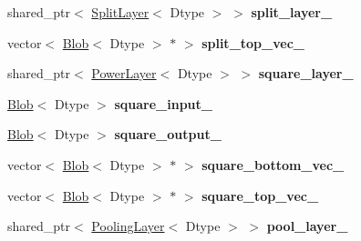 \begin{DoxyCompactItemize}
\item 
shared\+\_\+ptr$<$ \hyperlink{classcaffe_1_1SplitLayer}{Split\+Layer}$<$ Dtype $>$ $>$ {\bfseries split\+\_\+layer\+\_\+}\hypertarget{classcaffe_1_1LRNLayer_a7126b6cbb83ddafb80c9d9dc6d44f88f}{}\label{classcaffe_1_1LRNLayer_a7126b6cbb83ddafb80c9d9dc6d44f88f}

\item 
vector$<$ \hyperlink{classcaffe_1_1Blob}{Blob}$<$ Dtype $>$ $\ast$ $>$ {\bfseries split\+\_\+top\+\_\+vec\+\_\+}\hypertarget{classcaffe_1_1LRNLayer_a9b199156b8113800365c64c22e0e177a}{}\label{classcaffe_1_1LRNLayer_a9b199156b8113800365c64c22e0e177a}

\item 
shared\+\_\+ptr$<$ \hyperlink{classcaffe_1_1PowerLayer}{Power\+Layer}$<$ Dtype $>$ $>$ {\bfseries square\+\_\+layer\+\_\+}\hypertarget{classcaffe_1_1LRNLayer_a440a40fc6ec9131fd8425dabe8a48fa9}{}\label{classcaffe_1_1LRNLayer_a440a40fc6ec9131fd8425dabe8a48fa9}

\item 
\hyperlink{classcaffe_1_1Blob}{Blob}$<$ Dtype $>$ {\bfseries square\+\_\+input\+\_\+}\hypertarget{classcaffe_1_1LRNLayer_a750c4b6871af300f8de03b5eda197056}{}\label{classcaffe_1_1LRNLayer_a750c4b6871af300f8de03b5eda197056}

\item 
\hyperlink{classcaffe_1_1Blob}{Blob}$<$ Dtype $>$ {\bfseries square\+\_\+output\+\_\+}\hypertarget{classcaffe_1_1LRNLayer_a50c1f72f225f69d344857fc55dc52ef9}{}\label{classcaffe_1_1LRNLayer_a50c1f72f225f69d344857fc55dc52ef9}

\item 
vector$<$ \hyperlink{classcaffe_1_1Blob}{Blob}$<$ Dtype $>$ $\ast$ $>$ {\bfseries square\+\_\+bottom\+\_\+vec\+\_\+}\hypertarget{classcaffe_1_1LRNLayer_a0361883b2eada25a56b5a90f5ff99cac}{}\label{classcaffe_1_1LRNLayer_a0361883b2eada25a56b5a90f5ff99cac}

\item 
vector$<$ \hyperlink{classcaffe_1_1Blob}{Blob}$<$ Dtype $>$ $\ast$ $>$ {\bfseries square\+\_\+top\+\_\+vec\+\_\+}\hypertarget{classcaffe_1_1LRNLayer_accfb1597e6045b09dcdb421ba7e92070}{}\label{classcaffe_1_1LRNLayer_accfb1597e6045b09dcdb421ba7e92070}

\item 
shared\+\_\+ptr$<$ \hyperlink{classcaffe_1_1PoolingLayer}{Pooling\+Layer}$<$ Dtype $>$ $>$ {\bfseries pool\+\_\+layer\+\_\+}\hypertarget{classcaffe_1_1LRNLayer_a3d883b2d7022bd66e1ac2227400a1caa}{}\label{classcaffe_1_1LRNLayer_a3d883b2d7022bd66e1ac2227400a1caa}


\end{DoxyCompactItemize}
